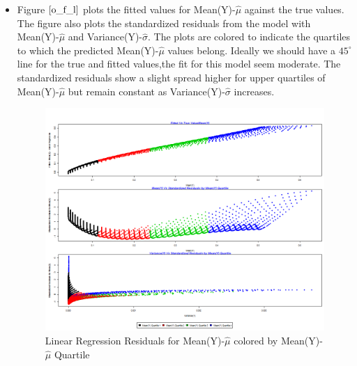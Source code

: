 \documentclass[twoside,12pt]{article}
\begin{document}
\begin{itemize}
\FloatBarrier
\item
Figure $\eqref{o_f_l}$ plots the fitted values for Mean(Y)-$\hat{\mu}$ against the true values. The figure also plots the standardized residuals from the model with Mean(Y)-$\hat{\mu}$ and Variance(Y)-$\hat{\sigma}$. The plots are colored to indicate the quartiles to which the predicted Mean(Y)-$\hat{\mu}$ values belong. Ideally we should have a $45^{\circ}$ line for the true and fitted values,the fit for this model seem moderate. The standardized residuals show a slight spread higher for upper quartiles of Mean(Y)-$\hat{\mu}$ but remain constant as Variance(Y)-$\hat{\sigma}$ increases.
\FloatBarrier
\begin{figure}[!htbp]
\centering
\includegraphics[scale=.50]{images/mt_rse_plot_mean_trg_slg.png} 
\caption{Linear Regression Residuals for Mean(Y)-$\hat{\mu}$ colored by Mean(Y)-$\hat{\mu}$  Quartile}
\label{o_f_l}
\end{figure}
\end{itemize}



\FloatBarrier
\end{document}
